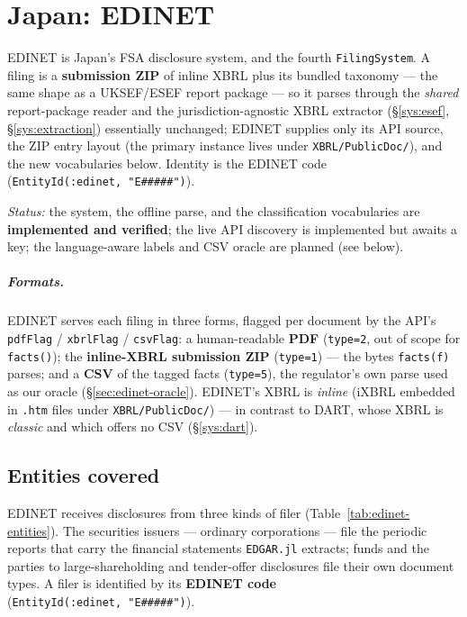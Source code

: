 \documentclass[11pt,a4paper]{report}
\begin{document}
\chapter{Japan: EDINET}
\label{sys:edinet}

EDINET is Japan's FSA disclosure system, and the fourth \texttt{FilingSystem}. A filing is a
\textbf{submission ZIP} of inline XBRL plus its bundled taxonomy --- the same shape as a UKSEF/ESEF
report package --- so it parses through the \emph{shared} report-package reader and the
jurisdiction-agnostic XBRL extractor (\S\ref{sys:esef}, \S\ref{sys:extraction}) essentially unchanged;
EDINET supplies only its API source, the ZIP entry layout (the primary instance lives under
\texttt{XBRL/PublicDoc/}), and the new vocabularies below. Identity is the EDINET code
(\texttt{EntityId(:edinet,\ "E\#\#\#\#\#")}).

\emph{Status:} the system, the offline parse, and the classification vocabularies are
\textbf{implemented and verified}; the live API discovery is implemented but awaits a key; the
language-aware labels and CSV oracle are planned (see below).

\paragraph{Formats.} EDINET serves each filing in three forms, flagged per document by the API's
\texttt{pdfFlag} / \texttt{xbrlFlag} / \texttt{csvFlag}: a human-readable \textbf{PDF} (\texttt{type=2},
out of scope for \texttt{facts()}); the \textbf{inline-XBRL submission ZIP} (\texttt{type=1}) --- the bytes
\texttt{facts(f)} parses; and a \textbf{CSV} of the tagged facts (\texttt{type=5}), the regulator's own
parse used as our oracle (\S\ref{sec:edinet-oracle}). EDINET's XBRL is \emph{inline} (iXBRL embedded in
\texttt{.htm} files under \texttt{XBRL/PublicDoc/}) --- in contrast to DART, whose XBRL is \emph{classic}
and which offers no CSV (\S\ref{sys:dart}).

\section{Entities covered}\label{sec:edinet-entities}

EDINET receives disclosures from three kinds of filer (Table~\ref{tab:edinet-entities}). The securities
issuers --- ordinary corporations --- file the periodic reports that carry the financial statements
\texttt{EDGAR.jl} extracts; funds and the parties to large-shareholding and tender-offer disclosures file
their own document types. A filer is identified by its \textbf{EDINET code}
(\texttt{EntityId(:edinet,\ "E\#\#\#\#\#")}).
\end{document}
